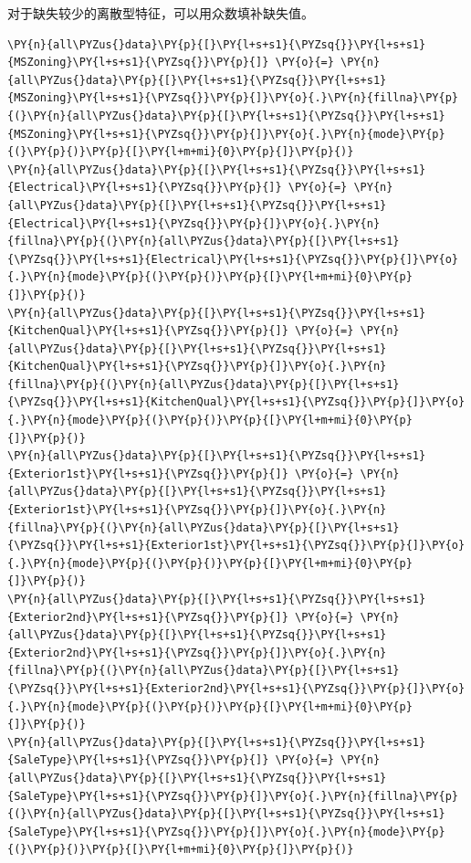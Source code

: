 \documentclass[no-math]{YangThesis}
\begin{document}
对于缺失较少的离散型特征，可以用众数填补缺失值。

\begin{tcolorbox}[breakable, size=fbox, boxrule=1pt, pad at break*=1mm,colback=cellbackground, colframe=cellborder]
	\begin{Verbatim}[commandchars=\\\{\}]
\PY{n}{all\PYZus{}data}\PY{p}{[}\PY{l+s+s1}{\PYZsq{}}\PY{l+s+s1}{MSZoning}\PY{l+s+s1}{\PYZsq{}}\PY{p}{]} \PY{o}{=} \PY{n}{all\PYZus{}data}\PY{p}{[}\PY{l+s+s1}{\PYZsq{}}\PY{l+s+s1}{MSZoning}\PY{l+s+s1}{\PYZsq{}}\PY{p}{]}\PY{o}{.}\PY{n}{fillna}\PY{p}{(}\PY{n}{all\PYZus{}data}\PY{p}{[}\PY{l+s+s1}{\PYZsq{}}\PY{l+s+s1}{MSZoning}\PY{l+s+s1}{\PYZsq{}}\PY{p}{]}\PY{o}{.}\PY{n}{mode}\PY{p}{(}\PY{p}{)}\PY{p}{[}\PY{l+m+mi}{0}\PY{p}{]}\PY{p}{)}
\PY{n}{all\PYZus{}data}\PY{p}{[}\PY{l+s+s1}{\PYZsq{}}\PY{l+s+s1}{Electrical}\PY{l+s+s1}{\PYZsq{}}\PY{p}{]} \PY{o}{=} \PY{n}{all\PYZus{}data}\PY{p}{[}\PY{l+s+s1}{\PYZsq{}}\PY{l+s+s1}{Electrical}\PY{l+s+s1}{\PYZsq{}}\PY{p}{]}\PY{o}{.}\PY{n}{fillna}\PY{p}{(}\PY{n}{all\PYZus{}data}\PY{p}{[}\PY{l+s+s1}{\PYZsq{}}\PY{l+s+s1}{Electrical}\PY{l+s+s1}{\PYZsq{}}\PY{p}{]}\PY{o}{.}\PY{n}{mode}\PY{p}{(}\PY{p}{)}\PY{p}{[}\PY{l+m+mi}{0}\PY{p}{]}\PY{p}{)}
\PY{n}{all\PYZus{}data}\PY{p}{[}\PY{l+s+s1}{\PYZsq{}}\PY{l+s+s1}{KitchenQual}\PY{l+s+s1}{\PYZsq{}}\PY{p}{]} \PY{o}{=} \PY{n}{all\PYZus{}data}\PY{p}{[}\PY{l+s+s1}{\PYZsq{}}\PY{l+s+s1}{KitchenQual}\PY{l+s+s1}{\PYZsq{}}\PY{p}{]}\PY{o}{.}\PY{n}{fillna}\PY{p}{(}\PY{n}{all\PYZus{}data}\PY{p}{[}\PY{l+s+s1}{\PYZsq{}}\PY{l+s+s1}{KitchenQual}\PY{l+s+s1}{\PYZsq{}}\PY{p}{]}\PY{o}{.}\PY{n}{mode}\PY{p}{(}\PY{p}{)}\PY{p}{[}\PY{l+m+mi}{0}\PY{p}{]}\PY{p}{)}
\PY{n}{all\PYZus{}data}\PY{p}{[}\PY{l+s+s1}{\PYZsq{}}\PY{l+s+s1}{Exterior1st}\PY{l+s+s1}{\PYZsq{}}\PY{p}{]} \PY{o}{=} \PY{n}{all\PYZus{}data}\PY{p}{[}\PY{l+s+s1}{\PYZsq{}}\PY{l+s+s1}{Exterior1st}\PY{l+s+s1}{\PYZsq{}}\PY{p}{]}\PY{o}{.}\PY{n}{fillna}\PY{p}{(}\PY{n}{all\PYZus{}data}\PY{p}{[}\PY{l+s+s1}{\PYZsq{}}\PY{l+s+s1}{Exterior1st}\PY{l+s+s1}{\PYZsq{}}\PY{p}{]}\PY{o}{.}\PY{n}{mode}\PY{p}{(}\PY{p}{)}\PY{p}{[}\PY{l+m+mi}{0}\PY{p}{]}\PY{p}{)}
\PY{n}{all\PYZus{}data}\PY{p}{[}\PY{l+s+s1}{\PYZsq{}}\PY{l+s+s1}{Exterior2nd}\PY{l+s+s1}{\PYZsq{}}\PY{p}{]} \PY{o}{=} \PY{n}{all\PYZus{}data}\PY{p}{[}\PY{l+s+s1}{\PYZsq{}}\PY{l+s+s1}{Exterior2nd}\PY{l+s+s1}{\PYZsq{}}\PY{p}{]}\PY{o}{.}\PY{n}{fillna}\PY{p}{(}\PY{n}{all\PYZus{}data}\PY{p}{[}\PY{l+s+s1}{\PYZsq{}}\PY{l+s+s1}{Exterior2nd}\PY{l+s+s1}{\PYZsq{}}\PY{p}{]}\PY{o}{.}\PY{n}{mode}\PY{p}{(}\PY{p}{)}\PY{p}{[}\PY{l+m+mi}{0}\PY{p}{]}\PY{p}{)}
\PY{n}{all\PYZus{}data}\PY{p}{[}\PY{l+s+s1}{\PYZsq{}}\PY{l+s+s1}{SaleType}\PY{l+s+s1}{\PYZsq{}}\PY{p}{]} \PY{o}{=} \PY{n}{all\PYZus{}data}\PY{p}{[}\PY{l+s+s1}{\PYZsq{}}\PY{l+s+s1}{SaleType}\PY{l+s+s1}{\PYZsq{}}\PY{p}{]}\PY{o}{.}\PY{n}{fillna}\PY{p}{(}\PY{n}{all\PYZus{}data}\PY{p}{[}\PY{l+s+s1}{\PYZsq{}}\PY{l+s+s1}{SaleType}\PY{l+s+s1}{\PYZsq{}}\PY{p}{]}\PY{o}{.}\PY{n}{mode}\PY{p}{(}\PY{p}{)}\PY{p}{[}\PY{l+m+mi}{0}\PY{p}{]}\PY{p}{)}
	\end{Verbatim}
\end{tcolorbox}
\end{document}
